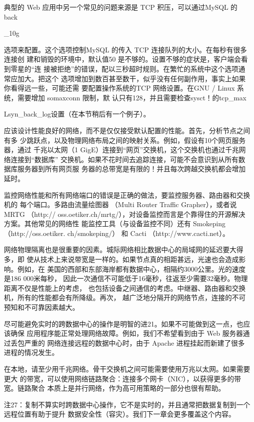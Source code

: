 典型的 Web 应用中另一个常见的问题来源是 TCP 积压，可以通过MySQL 的back

\_10g

选项来配置。这个选项控制MySQL 的传入 TCP 连接队列的大小。在每秒有很多连接创
建和销毁的环境中，默认值50 是不够的。设置不够的症状是，客户端会看到零星的“连
接被拒绝”的错误，配以三秒超时规则。在繁忙的系统中这个选项通常应加大。把这个
选项增加到数百甚至数干，似乎没有任何副作用，事实上如果你看得远一些，可能还需
要配置操作系统的TCP 网络设置。在GNU / Linux 系统，需要增加 somaxconn 限制，默
认只有128，并且需要检查sysct！的tcp\_max

Lsyn\_back\_log设置（在本节稍后有一个例子）。

应该设计性能良好的网络，而不是仅仅接受默认配置的性能。首先，分析节点之间有多
少跳跃点，以及物理网络布局之间的映射关系。例如，假设有10个网页服务器，通过
千兆以太网（1 GigE）连接到“网页”交换机，这个交换机也通过千兆网络连接到“数据库”
交换机。如果不花时间去追踪连接，可能不会意识到从所有数据库服务器到所有网页服
务器的总带宽是有限的！并且每次跨越交换机都会增加延时。

监控网络性能和所有网络端口的错误是正确的做法，要监控服务器、路由器和交换机的
每个端口。多路由流量绘图器 （Multi Router Traffic Grapher），或者说 MRTG （http://
oss.oetiker.ch/mrtg/），对设备监控而言是个靠得住的开源解决方案。其他常见的网络性
能监控工具（与设备监控不同）还有 Smokeping （http://oss.oetiker. ch/smokeping/） 和
Cacti （http://www.cacti.net）。

网络物理隔离也是很重要的因素。城际网络相比数据中心的局域网的延迟要大得多，即
使从技术上来说带宽是一样的。如果节点真的相距甚远，光速也会造成影响。例如，在
美国的西部和东部海岸都有数据中心，相隔约3000公里。光的速度是186 000米每秒，
因此一次通信不可能低于16毫秒，往返至少需要32毫秒。物理距离不仅是性能上的考虑，
也包括设备之间通信的考虑。中继器、路由器和交换机，所有的性能都会有所降级。再次，
越广泛地分隔开的网络节点，连接的不可预知和不可靠因素越大。

尽可能避免实时的跨数据中心的操作是明智的进21。如果不可能做到这一点，也应该确保
应用程序能正常处理网络故障。例如，我们不希望看到由于 Web 服务器通过丢包严重的
网络连接远程的数据中心时，由于 Apache 进程挂起而新建了很多进程的情况发生。

在本地，请至少用千兆网络。骨干交换机之间可能需要使用万兆以太网。如果需要更大
的带宽，可以使用网络链路聚合：连接多个网卡（NIC），以获得更多的带宽。链路聚合
本质上是并行网络，作为高可用策略的一部分也很有帮助。

注27：复制不算实时跨数据中心操作，它不是实时的，并且通常把数据复制到一个远程位置有助于提升
数据安全性（容灾）。我们下一章会更多覆盖这个内容。

